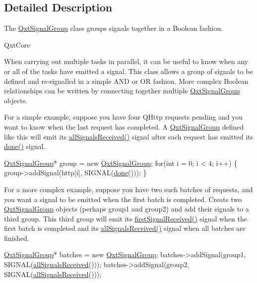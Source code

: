 \subsection{Detailed Description}
The \hyperlink{class_qxt_signal_group}{Qxt\-Signal\-Group} class groups signals together in a Boolean fashion. 

Qxt\-Core

When carrying out multiple tasks in parallel, it can be useful to know when any or all of the tasks have emitted a signal. This class allows a group of signals to be defined and re-\/signalled in a simple A\-N\-D or O\-R fashion. More complex Boolean relationships can be written by connecting together multiple \hyperlink{class_qxt_signal_group}{Qxt\-Signal\-Group} objects.

For a simple example, suppose you have four Q\-Http requests pending and you want to know when the last request has completed. A \hyperlink{class_qxt_signal_group}{Qxt\-Signal\-Group} defined like this will emit its \hyperlink{class_qxt_signal_group_a4c51ee7c10d27da5c3b086a40a711c61}{all\-Signals\-Received()} signal after each request has emitted its \hyperlink{qxtjob_8h_ab650651e4cda2869f73100c6fd2c821a}{done()} signal. 
\begin{DoxyCode}
\hyperlink{class_qxt_signal_group}{QxtSignalGroup}* group = \textcolor{keyword}{new} \hyperlink{class_qxt_signal_group}{QxtSignalGroup};
\textcolor{keywordflow}{for}(\textcolor{keywordtype}{int} i = 0; i < 4; i++) \{
    group->addSignal(http[i], SIGNAL(\hyperlink{qxtjob_8h_ab650651e4cda2869f73100c6fd2c821a}{done}()));
\}
\end{DoxyCode}


For a more complex example, suppose you have two such batches of requests, and you want a signal to be emitted when the first batch is completed. Create two \hyperlink{class_qxt_signal_group}{Qxt\-Signal\-Group} objects (perhaps group1 and group2) and add their signals to a third group. This third group will emit its \hyperlink{class_qxt_signal_group_a7399023c039399d4eb540c0d58c6afc2}{first\-Signal\-Received()} signal when the first batch is completed and its \hyperlink{class_qxt_signal_group_a4c51ee7c10d27da5c3b086a40a711c61}{all\-Signals\-Received()} signal when all batches are finished. 
\begin{DoxyCode}
\hyperlink{class_qxt_signal_group}{QxtSignalGroup}* batches = \textcolor{keyword}{new} \hyperlink{class_qxt_signal_group}{QxtSignalGroup};
batches->addSignal(group1, SIGNAL(\hyperlink{class_qxt_signal_group_a4c51ee7c10d27da5c3b086a40a711c61}{allSignalsReceived}()));
batches->addSignal(group2, SIGNAL(\hyperlink{class_qxt_signal_group_a4c51ee7c10d27da5c3b086a40a711c61}{allSignalsReceived}()));
\end{DoxyCode}
 


